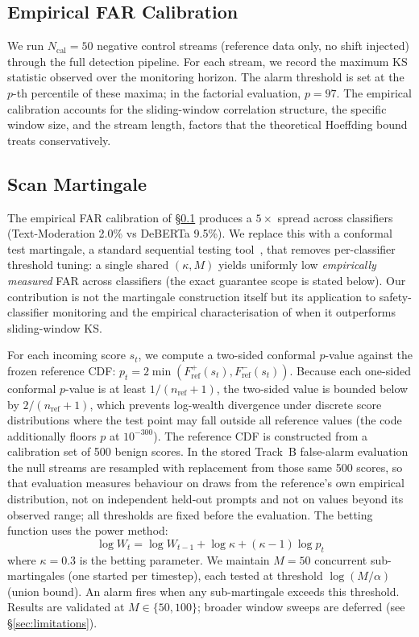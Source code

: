 \documentclass{article}
\begin{document}
\subsection{Empirical FAR Calibration}
\label{sec:far-calibration}

We run $N_{\text{cal}} = 50$ negative control streams (reference data only, no shift injected) through the full detection pipeline. For each stream, we record the maximum KS statistic observed over the monitoring horizon. The alarm threshold is set at the $p$-th percentile of these maxima; in the factorial evaluation, $p = 97$. The empirical calibration accounts for the sliding-window correlation structure, the specific window size, and the stream length, factors that the theoretical Hoeffding bound treats conservatively.

\subsection{Scan Martingale}
\label{sec:martingale}

The empirical FAR calibration of \S\ref{sec:far-calibration} produces a $5\times$ spread across classifiers (Text-Moderation 2.0\% vs DeBERTa 9.5\%). We replace this with a conformal test martingale, a standard sequential testing tool~\citep{howard2021timeuniform,waudbysmith2024estimating}, that removes per-classifier threshold tuning: a single shared $(\kappa, M)$ yields uniformly low \emph{empirically measured} FAR across classifiers (the exact guarantee scope is stated below). Our contribution is not the martingale construction itself but its application to safety-classifier monitoring and the empirical characterisation of when it outperforms sliding-window KS.

For each incoming score $s_t$, we compute a two-sided conformal $p$-value against the frozen reference CDF: $p_t = 2 \min(F_{\text{ref}}^+(s_t), F_{\text{ref}}^-(s_t))$. Because each one-sided conformal $p$-value is at least $1/(n_{\text{ref}}+1)$, the two-sided value is bounded below by $2/(n_{\text{ref}}+1)$, which prevents log-wealth divergence under discrete score distributions where the test point may fall outside all reference values (the code additionally floors $p$ at $10^{-300}$). The reference CDF is constructed from a calibration set of 500 benign scores. In the stored Track~B false-alarm evaluation the null streams are resampled with replacement from those same 500 scores, so that evaluation measures behaviour on draws from the reference's own empirical distribution, not on independent held-out prompts and not on values beyond its observed range; all thresholds are fixed before the evaluation. The betting function uses the power method:
\begin{equation}
\log W_t = \log W_{t-1} + \log \kappa + (\kappa - 1) \log p_t
\end{equation}
where $\kappa = 0.3$ is the betting parameter. We maintain $M = 50$ concurrent sub-martingales (one started per timestep), each tested at threshold $\log(M/\alpha)$ (union bound). An alarm fires when any sub-martingale exceeds this threshold. Results are validated at $M \in \{50, 100\}$; broader window sweeps are deferred (see \S\ref{sec:limitations}).
\end{document}
